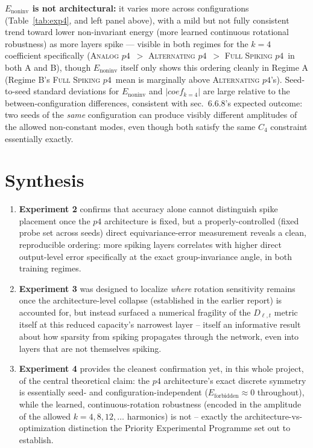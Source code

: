 \documentclass[11pt]{article}
\newcommand{\None}{\textsc{Analog $p4$}}
\newcommand{\Alternating}{\textsc{Alternating $p4$}}
\newcommand{\FullSpiking}{\textsc{Full Spiking $p4$}}
\begin{document}
\noindent \textbf{$E_{\text{noninv}}$ is not architectural:} it varies more across configurations
(Table~\ref{tab:exp4}, and left panel above), with a mild but not fully consistent trend toward lower
non-invariant energy (more learned continuous rotational robustness) as more layers spike --- visible
in both regimes for the $k{=}4$ coefficient specifically (\None\ $>$ \Alternating\ $>$ \FullSpiking\ in
both A and B), though $E_{\text{noninv}}$ itself only shows this ordering cleanly in Regime A (Regime
B's \FullSpiking\ mean is marginally above \Alternating's). Seed-to-seed standard deviations for
$E_{\text{noninv}}$ and $|coef_{k=4}|$ are large relative to the between-configuration differences,
consistent with sec.\ 6.6.8's expected outcome: two seeds of the \emph{same} configuration can produce
visibly different amplitudes of the allowed non-constant modes, even though both satisfy the same
$C_4$ constraint essentially exactly.

\section{Synthesis}

\begin{enumerate}[leftmargin=1.5em]
\item \textbf{Experiment 2} confirms that accuracy alone cannot distinguish spike placement once the
$p4$ architecture is fixed, but a properly-controlled (fixed probe set across seeds) direct
equivariance-error measurement reveals a clean, reproducible ordering: more spiking layers correlates
with higher direct output-level error specifically at the exact group-invariance angle, in both
training regimes.
\item \textbf{Experiment 3} was designed to localize \emph{where} rotation sensitivity remains once
the architecture-level collapse (established in the earlier report) is accounted for, but instead
surfaced a numerical fragility of the $D_{\ell,t}$ metric itself at this reduced capacity's narrowest
layer -- itself an informative result about how sparsity from spiking propagates through the network,
even into layers that are not themselves spiking.
\item \textbf{Experiment 4} provides the cleanest confirmation yet, in this whole project, of the
central theoretical claim: the $p4$ architecture's exact discrete symmetry is essentially seed- and
configuration-independent ($E_{\text{forbidden}} \approx 0$ throughout), while the learned,
continuous-rotation robustness (encoded in the amplitude of the allowed $k=4,8,12,\ldots$ harmonics)
is not -- exactly the architecture-vs-optimization distinction the Priority Experimental Programme set
out to establish.
\end{enumerate}
\end{document}
